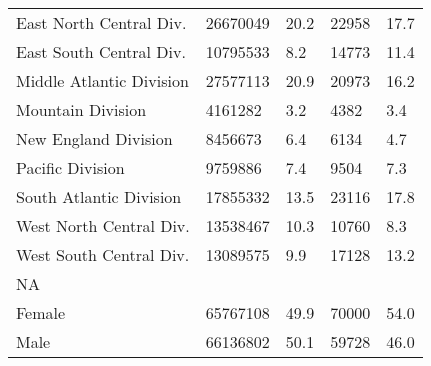 \begin{longtable}{lllll}
\midrule
East North Central Div. & 26670049 & 20.2 & 22958 & 17.7 \\ 
East South Central Div. & 10795533 & 8.2 & 14773 & 11.4 \\ 
Middle Atlantic Division & 27577113 & 20.9 & 20973 & 16.2 \\ 
Mountain Division & 4161282 & 3.2 & 4382 & 3.4 \\ 
New England Division & 8456673 & 6.4 & 6134 & 4.7 \\ 
Pacific Division & 9759886 & 7.4 & 9504 & 7.3 \\ 
South Atlantic Division & 17855332 & 13.5 & 23116 & 17.8 \\ 
West North Central Div. & 13538467 & 10.3 & 10760 & 8.3 \\ 
West South Central Div. & 13089575 & 9.9 & 17128 & 13.2 \\ 
\midrule
\multicolumn{1}{l}{NA} \\ 
\midrule
Female & 65767108 & 49.9 & 70000 & 54.0 \\ 
Male & 66136802 & 50.1 & 59728 & 46.0 \\ 
\bottomrule
\end{longtable}

